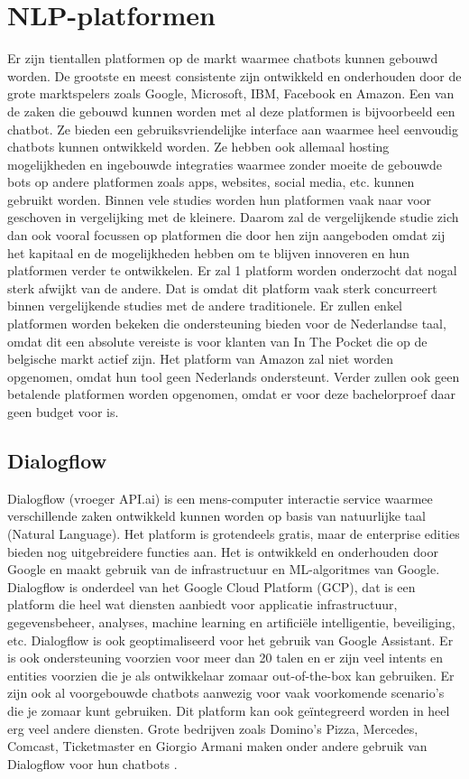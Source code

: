 \section{NLP-platformen}
\label{sec:nlp-platformen}

Er zijn tientallen platformen op de markt waarmee chatbots kunnen gebouwd worden. De grootste en meest consistente zijn ontwikkeld en onderhouden door de grote marktspelers zoals Google, Microsoft, IBM, Facebook en Amazon. Een van de zaken die gebouwd kunnen worden met al deze platformen is bijvoorbeeld een chatbot. Ze bieden een gebruiksvriendelijke interface aan waarmee heel eenvoudig chatbots kunnen ontwikkeld worden. Ze hebben ook allemaal hosting mogelijkheden en ingebouwde integraties waarmee zonder moeite de gebouwde bots op andere platformen zoals apps, websites, social media, etc. kunnen gebruikt worden. Binnen vele studies worden hun platformen vaak naar voor geschoven in vergelijking met de kleinere. Daarom zal de vergelijkende studie zich dan ook vooral focussen op platformen die door hen zijn aangeboden omdat zij het kapitaal en de mogelijkheden hebben om te blijven innoveren en hun platformen verder te ontwikkelen. Er zal 1 platform worden onderzocht dat nogal sterk afwijkt van de andere. Dat is omdat dit platform vaak sterk concurreert binnen vergelijkende studies met de andere traditionele. Er zullen enkel platformen worden bekeken die ondersteuning bieden voor de Nederlandse taal, omdat dit een absolute vereiste is voor klanten van In The Pocket die op de belgische markt actief zijn. Het platform van Amazon zal niet worden opgenomen, omdat hun tool geen Nederlands ondersteunt. Verder zullen ook geen betalende platformen worden opgenomen, omdat er voor deze bachelorproef daar geen budget voor is.

\subsection{Dialogflow}
\label{subsec:nlp-platformen-dialogflow}

Dialogflow (vroeger API.ai) is een mens-computer interactie service waarmee verschillende zaken ontwikkeld kunnen worden op basis van natuurlijke taal (Natural Language). Het platform is grotendeels gratis, maar de enterprise edities bieden nog uitgebreidere functies aan. Het is ontwikkeld en onderhouden door Google en maakt gebruik van de infrastructuur en ML-algoritmes van Google. Dialogflow is onderdeel van het Google Cloud Platform (GCP), dat is een platform die heel wat diensten aanbiedt voor applicatie infrastructuur, gegevensbeheer, analyses, machine learning en artificiële intelligentie, beveiliging, etc. Dialogflow is ook geoptimaliseerd voor het gebruik van Google Assistant. Er is ook ondersteuning voorzien voor meer dan 20 talen en er zijn veel intents en entities voorzien die je als ontwikkelaar zomaar out-of-the-box kan gebruiken. Er zijn ook al voorgebouwde chatbots aanwezig voor vaak voorkomende scenario’s die je zomaar kunt gebruiken. Dit platform kan ook geïntegreerd worden in heel erg veel andere diensten. Grote bedrijven zoals Domino’s Pizza, Mercedes, Comcast, Ticketmaster en Giorgio Armani maken onder andere gebruik van Dialogflow voor hun chatbots \autocite{Dialogflow2020}. 

